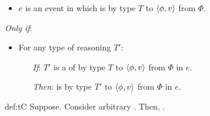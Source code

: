 \begin{note}
  \begin{proposition}[\tC{2}]
    \label{def:tC}

    \noindent%

    \begin{itemize}
    \item
      \(e\) is an event in which \vAgent{} is \emph{} by type \(T\) to \(\langle \phi, v \rangle\) from \(\Phi\).
    \end{itemize}

    \emph{Only if}:

    \begin{itemize}[noitemsep]
    \item
      For any type of reasoning \(T'\):
      \begin{itemize}
      \item[\emph{If}:]
        \(T'\) is a \tRep{} of \vAgent{} \tC{} by type \(T\) to \(\langle \phi, v \rangle\) from \(\Phi\) in \(e\).
      \item[\emph{Then}:]
        \vAgent{} is \ptCV{} by type \(T'\) to \(\langle \phi, v \rangle\) from \(\Phi\) in \(e\).
      \end{itemize}
    \end{itemize}
    \vspace{-\baselineskip}
  \end{proposition}

  \begin{argument}{def:tC}
    Suppose.
    Consider arbitrary \tRep{}.
    Then, \ptC{}.
  \end{argument}
\end{note}



